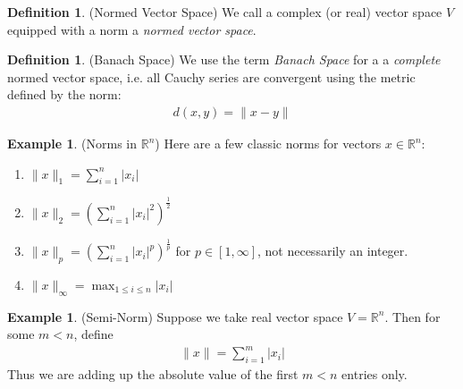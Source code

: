 \documentclass[12pt]{article}
\numberwithin{equation}{section} %
\theoremstyle{plain}
\theoremstyle{definition}
\newtheorem{defn}[thm]{Definition}
\newtheorem{ex}[thm]{Example}
\theoremstyle{remark}
\newcommand{\Rn}{\mathbb{R}^n}
\begin{document}
\begin{defn}(Normed Vector Space)
We call a complex (or real) vector space $V$ equipped with a norm a
\emph{normed vector space}.
\end{defn}


\begin{defn}(Banach Space)
We use the term \emph{Banach Space} for a a \emph{complete} normed
vector space, i.e. all Cauchy series are convergent using the metric
defined by the norm:
\begin{align*}
  d(x,y) = \lVert x-y\rVert
\end{align*}
\end{defn}

\begin{ex}(Norms in $\Rn$)
Here are a few classic norms for vectors $x\in \Rn$:
\begin{enumerate}
\item $\lVert x\rVert_1 = \sum^n_{i=1} |x_i|$
\item $\lVert x\rVert_2 = \left(\sum_{i=1}^n |x_i|^2\right)^{\frac{1}{2}}$
\item $\lVert x\rVert_p = \left(\sum_{i=1}^n
  |x_i|^p\right)^{\frac{1}{p}}$ for $p\in[1,\infty]$, not necessarily an
  integer.
\item $\lVert x\rVert_\infty = \max_{1\leq i\leq n} |x_i|$
\end{enumerate}
\end{ex}

\begin{ex}(Semi-Norm)
Suppose we take real vector space $V=\Rn$. Then for some $m<n$, define
\begin{align*}
  \lVert x\rVert = \sum_{i=1}^m |x_i|
\end{align*}
Thus we are adding up the absolute value of the first $m<n$ entries
only.
\end{ex}


\clearpage
\end{document}
